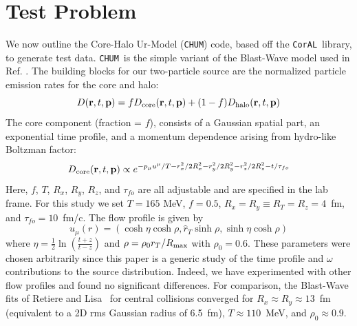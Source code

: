 \documentclass[aps,prl,twocolumn,floatfix,preprintnumbers,showpacs]{revtex4}
\newcommand{\CorAL}{{\tt CorAL}}
\newcommand{\CHUM}{{\tt CHUM}}
\begin{document}
\section{Test Problem}
We now outline the Core-Halo Ur-Model (\CHUM) code, based off the \CorAL\ library, to generate test data.  \CHUM\ is the simple variant of the Blast-Wave model used in Ref. \cite{srcTail}.              
The building blocks for our two-particle source are the normalized particle emission rates for the core and halo:
\begin{equation}
    D({\bf r}, t, {\bf p}) = fD_{\rm core}({\bf r}, t, {\bf p}) + (1-f)D_{\rm halo}({\bf r}, t, {\bf p})
\end{equation}
The core component (fraction = $f$), consists of a Gaussian spatial part, an exponential time profile, and a momentum dependence arising from hydro-like Boltzman factor:
\begin{equation}
    D_{\rm core}({\bf r}, t, {\bf p}) \propto e^{-p_{\mu} u^{\mu}/T -r^2_x/2R^2_x -r^2_y/2R^2_y -r^2_z/2R^2_z -t/\tau_{fo}}
\end{equation}
Here, $f$, $T$, $R_x$, $R_y$, $R_z$, and $\tau_{fo}$ are all adjustable and are specified in the lab frame.  For this study we set $T = 165$ MeV, $f=0.5$, $R_x = R_y \equiv R_T = R_z = 4$~fm, and $\tau_{fo}=10$~fm/c.  The flow profile is given by
\begin{equation}
    u_{\mu}(r) = \left(\cosh\eta \cosh\rho, \hat{r}_{T}\sinh\rho, \sinh\eta \cosh\rho\right)    
\end{equation}
where $\eta = \frac{1}{2}\ln\left(\frac{t+z}{t-z}\right)$ and $\rho = \rho_{0}r_{T}/R_{\rm max}$ with $\rho_{0}=0.6$.  These parameters were chosen arbitrarily since this paper is a generic study of the time profile and $\omega$ contributions to the source distribution.  Indeed, we have experimented with other flow profiles and found no significant differences.  For comparison, the Blast-Wave fits of Retiere and Lisa~\cite{blastwave} for central collisions converged for $R_x \approx R_y \approx 13$~fm (equivalent to a 2D rms Gaussian radius of 6.5~fm), $T \approx 110$~MeV, and $\rho_{0} \approx 0.9$. 
\end{document}
